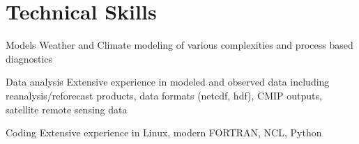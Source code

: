 \section*{Technical Skills}
\begin{tlist}
\item[Models]   Weather and Climate modeling of various complexities and process based diagnostics
  
\item[Data analysis]  Extensive experience in  modeled and observed data including reanalysis/reforecast products, data formats (netcdf, hdf), CMIP outputs, satellite remote sensing data
  
\item[Coding]    Extensive experience in Linux,  modern FORTRAN, NCL, Python
   

\end{tlist}
